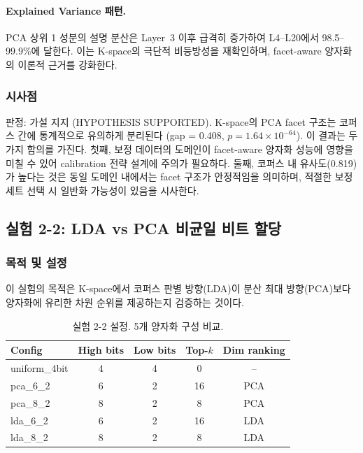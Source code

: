 \documentclass[11pt,a4paper]{article}
\begin{document}
\paragraph{Explained Variance 패턴.}
PCA 상위 1 성분의 설명 분산은 Layer~3 이후 급격히 증가하여 L4--L20에서 98.5--99.9\%에 달한다.
이는 K-space의 극단적 비등방성을 재확인하며, facet-aware 양자화의 이론적 근거를 강화한다.

\subsubsection{시사점}

판정: \textcolor{success}{가설 지지 (HYPOTHESIS SUPPORTED)}.
K-space의 PCA facet 구조는 코퍼스 간에 통계적으로 유의하게 분리된다 (gap = 0.408, $p = 1.64 \times 10^{-64}$).
이 결과는 두 가지 함의를 가진다.
첫째, 보정 데이터의 도메인이 facet-aware 양자화 성능에 영향을 미칠 수 있어 calibration 전략 설계에 주의가 필요하다.
둘째, 코퍼스 내 유사도(0.819)가 높다는 것은 동일 도메인 내에서는 facet 구조가 안정적임을 의미하며, 적절한 보정 세트 선택 시 일반화 가능성이 있음을 시사한다.

\subsection{실험 2-2: LDA vs PCA 비균일 비트 할당}

\subsubsection{목적 및 설정}

이 실험의 목적은 K-space에서 코퍼스 판별 방향(LDA)이 분산 최대 방향(PCA)보다 양자화에 유리한 차원 순위를 제공하는지 검증하는 것이다.

\begin{table}[H]
\centering
\caption{실험 2-2 설정. 5개 양자화 구성 비교.}
\label{tab:exp22_setup}
\begin{tabular}{lcccc}
\toprule
\textbf{Config} & \textbf{High bits} & \textbf{Low bits} & \textbf{Top-$k$} & \textbf{Dim ranking} \\
\midrule
uniform\_4bit & 4 & 4 & 0 & -- \\
pca\_6\_2 & 6 & 2 & 16 & PCA \\
pca\_8\_2 & 8 & 2 & 8 & PCA \\
lda\_6\_2 & 6 & 2 & 16 & LDA \\
lda\_8\_2 & 8 & 2 & 8 & LDA \\
\bottomrule
\end{tabular}
\end{table}
\end{document}
